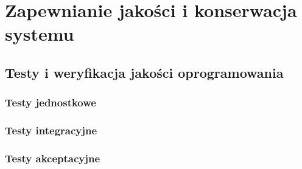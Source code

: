 \chapter{Zapewnianie jakości i konserwacja systemu}
\label{Chapter7}

\section{Testy i weryfikacja jakości oprogramowania}
\label{Chapter71}

\subsection{Testy jednostkowe}
\label{Chapter711}


\subsection{Testy integracyjne}
\label{Chapter712}


\subsection{Testy akceptacyjne}
\label{Chapter713}



%

